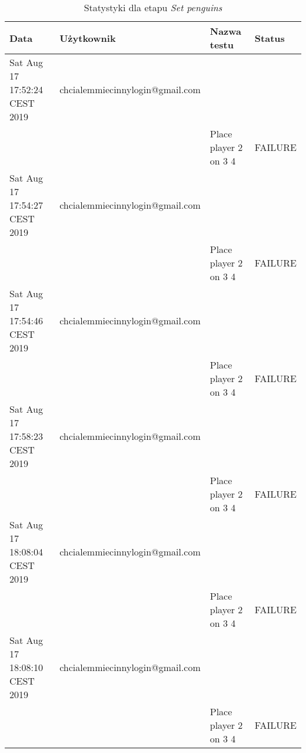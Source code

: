\scriptsize
\begin{center}
    \begin{longtable}{|l|l|l|l|}
        \caption{Statystyki dla etapu \textit{Set penguins}}
        \label{tab:set_penguins} \\\hline
        \hline
        \rowcolor[HTML]{EFEFEF}
        \textbf{Data}                 & \textbf{Użytkownik}             & \textbf{Nazwa testu}             & \textbf{Status} \\ \hline
        Sat Aug 17 17:52:24 CEST 2019 & chcialemmiecinnylogin@gmail.com &                                  &                 \\ \hline
        &                                 & Place player 2 on 3 4            & FAILURE         \\ \hline
        Sat Aug 17 17:54:27 CEST 2019 & chcialemmiecinnylogin@gmail.com &                                  &                 \\ \hline
        &                                 & Place player 2 on 3 4            & FAILURE         \\ \hline
        Sat Aug 17 17:54:46 CEST 2019 & chcialemmiecinnylogin@gmail.com &                                  &                 \\ \hline
        &                                 & Place player 2 on 3 4            & FAILURE         \\ \hline
        Sat Aug 17 17:58:23 CEST 2019 & chcialemmiecinnylogin@gmail.com &                                  &                 \\ \hline
        &                                 & Place player 2 on 3 4            & FAILURE         \\ \hline
        Sat Aug 17 18:08:04 CEST 2019 & chcialemmiecinnylogin@gmail.com &                                  &                 \\ \hline
        &                                 & Place player 2 on 3 4            & FAILURE         \\ \hline
        Sat Aug 17 18:08:10 CEST 2019 & chcialemmiecinnylogin@gmail.com &                                  &                 \\ \hline
        &                                 & Place player 2 on 3 4            & FAILURE         \\ \hline

\end{longtable}
\end{center}
